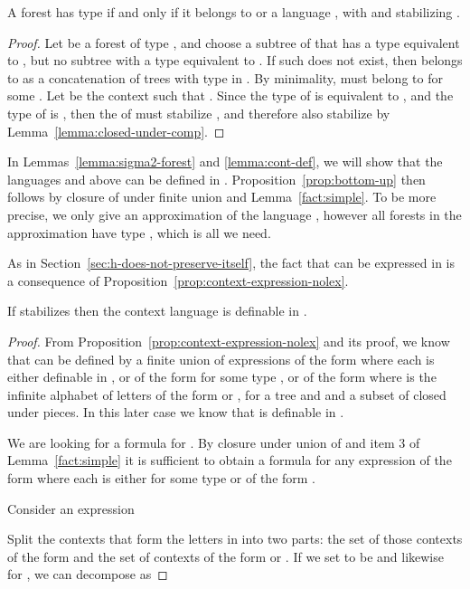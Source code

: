 \documentclass{LMCS}
\begin{document}
{\begin{lem}\label{lem:decompo-nonminim-nolex}
A forest has type  if and only if it belongs to  or a
language , with  and  stabilizing .
\end{lem}
\vspace{-.2cm}
\begin{proof}
  Let  be a forest of type , and choose  a subtree of  that has a
  type equivalent to , but no subtree with a type equivalent to . If such
   does not exist, then  belongs to  as a concatenation of trees
  with type in .  By minimality,  must belong to  for some . Let  be the context such that .  Since the type of  is
  equivalent to , and the type of  is , then the of  must
  stabilize ,  and therefore also stabilize  by
  Lemma~\ref{lemma:closed-under-comp}.
\end{proof}

In Lemmas~\ref{lemma:sigma2-forest} and \ref{lemma:cont-def}, we will
show that the languages  and  above can be defined in
\Stwo. Proposition~\ref{prop:bottom-up} then follows by closure of \Stwo
under finite union and Lemma~\ref{fact:simple}.
To be more precise, we only give an approximation
 of the language , however all forests in the
approximation have type , which is all we need.

As in Section~\ref{sec:h-does-not-preserve-itself}, the fact that  can be
expressed in \Stwo is a consequence of
Proposition~\ref{prop:context-expression-nolex}.

\begin{lem}\label{lemma:cont-def}
 If     stabilizes  then the context language  is definable in \Stwo.
\end{lem}
\begin{proof}
  From Proposition~\ref{prop:context-expression-nolex} and its proof,
  we know that  can be defined by a finite union of expressions
  of the form  where each  is either
  definable in \Stwo, or of the form  for some type , or of the form  where  is the
  infinite alphabet of letters of the form  or ,
  for  a tree and  and  a subset of  closed under
  pieces. In this later case we know that  is definable in
  .
 
  We are looking for a \Stwo formula for . By closure under union of \Stwo
  and item 3 of Lemma~\ref{fact:simple} it is sufficient to obtain a \Stwo
  formula for any expression of the form  where each 
  is either  for some type  or of the form .

  Consider an expression
  
 Split  the contexts that form the  letters in 
  into two  parts: the set   of  those contexts of the
  form  and the set   of contexts of the form
  or . If we set  to be  and likewise for , we can decompose  as 
  

\end{proof}}
\end{document}
